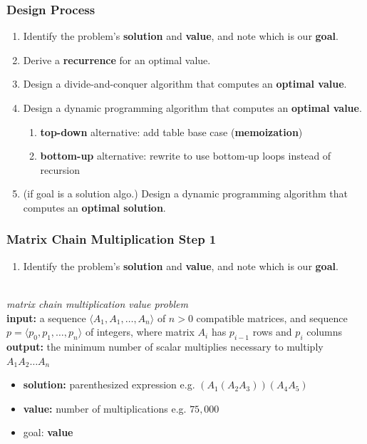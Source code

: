 \documentclass{beamer}
\newcommand{\stanza}{ \\~\ }
\begin{document}
\begin{frame} \frametitle{Design Process}
  \begin{enumerate}
    \item Identify the problem's \textbf{solution} and \textbf{value}, and note which is our \textbf{goal}.
    \item Derive a \textbf{recurrence} for an optimal value.
    \item Design a divide-and-conquer algorithm that computes an \textbf{optimal value}.
    \item Design a dynamic programming algorithm that computes an \textbf{optimal value}.
    \begin{enumerate}
      \item \textbf{top-down} alternative: add table base case (\textbf{memoization})
      \item \textbf{bottom-up} alternative: rewrite to use bottom-up loops instead of recursion
    \end{enumerate}
    \item (if goal is a solution algo.) Design a dynamic programming algorithm that computes an \textbf{optimal solution}.
  \end{enumerate}
  \end{frame}
  
\begin{frame} \frametitle{Matrix Chain Multiplication Step 1}
\begin{enumerate}
  \item Identify the problem's \textbf{solution} and \textbf{value}, and note which is our \textbf{goal}.
  \stanza
\end{enumerate}
\emph{matrix chain multiplication value problem} \\
\textbf{input:} a sequence $\langle A_1, A_1, \ldots, A_n \rangle$ of $n>0$ compatible matrices,
  and sequence $p=\langle p_0, p_1, \ldots, p_n \rangle$ of integers, where
  matrix $A_i$ has $p_{i-1}$ rows and $p_i$ columns \\
\textbf{output:} the minimum number of scalar multiplies necessary to multiply $A_1 A_2 \ldots A_n$ 
\begin{itemize}
  \item \textbf{solution:} parenthesized expression e.g. $(A_1(A_2 A_3))(A_4 A_5)$
  \item \textbf{value:} number of multiplications e.g. $75,000$
  \item goal: \textbf{value}
\end{itemize}
\end{frame}
\end{document}
